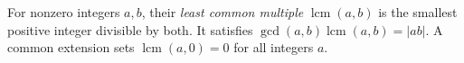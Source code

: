 
For nonzero integers $a,b$, their \emph{least common multiple} $\operatorname{lcm}(a,b)$ is the smallest positive integer divisible by both. It satisfies $\gcd(a,b)\operatorname{lcm}(a,b)=|ab|$. A common extension sets $\operatorname{lcm}(a,0)=0$ for all integers $a$.

